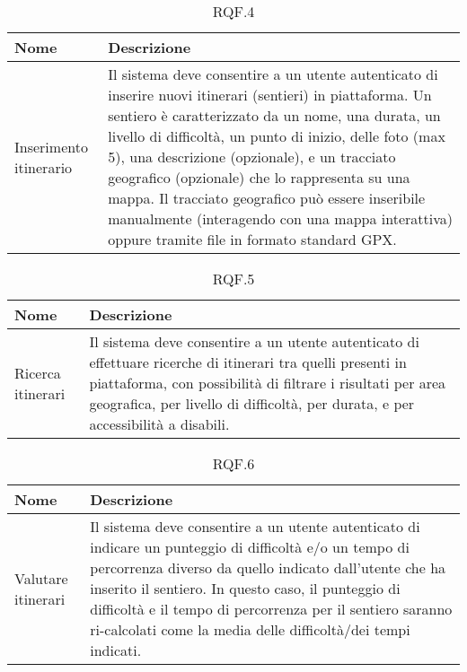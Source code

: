 \documentclass{natourDoc}
\begin{document}
	\begin{table}[H]
		\centering
		\begin{tabular}{ |p{5cm}|p{10.3cm}| } 
			\hline
			\rowcolor{PineGreen!70}
			\textbf{Nome} & \textbf{Descrizione} \\
			\hline
			Inserimento itinerario &  Il sistema deve consentire a un utente autenticato di inserire nuovi itinerari (sentieri) in piattaforma. Un sentiero è
			caratterizzato da un nome, una durata, un livello di difficoltà, un punto di inizio, delle foto (max 5), una descrizione
			(opzionale), e un tracciato geografico (opzionale) che lo rappresenta su una mappa. Il tracciato
			geografico può essere inseribile manualmente (interagendo con una mappa interattiva) oppure
			tramite file in formato standard GPX.\\ 
			\hline
		\end{tabular}
		\caption{RQF.4}
		\label{table:4}
	\end{table}
	
	\begin{table}[H]
		\centering
		\begin{tabular}{ |p{5cm}|p{10.3cm}| } 
			\hline
			\rowcolor{PineGreen!70}
			\textbf{Nome} & \textbf{Descrizione} \\
			\hline
			Ricerca itinerari &  Il sistema deve consentire a un utente autenticato di effettuare ricerche di itinerari tra quelli presenti in piattaforma, con possibilità di filtrare i risultati
			per area geografica, per livello di difficoltà, per durata, e per accessibilità a disabili.\\ 
			\hline
		\end{tabular}
		\caption{RQF.5}
		\label{table:5}
	\end{table}
	
	\begin{table}[H]
		\centering
		\begin{tabular}{ |p{5cm}|p{10.3cm}| } 
			\hline
			\rowcolor{PineGreen!70}
			\textbf{Nome} & \textbf{Descrizione} \\
			\hline
			Valutare itinerari & Il sistema deve consentire a un utente autenticato di indicare un punteggio di difficoltà e/o un tempo
			di percorrenza diverso da quello indicato dall’utente che ha inserito il sentiero. In questo caso, il
			punteggio di difficoltà e il tempo di percorrenza per il sentiero saranno ri-calcolati come la media
			delle difficoltà/dei tempi indicati.\\ 
			\hline
		\end{tabular}
		\caption{RQF.6}
		\label{table:6}
	\end{table}
	
\end{document}
